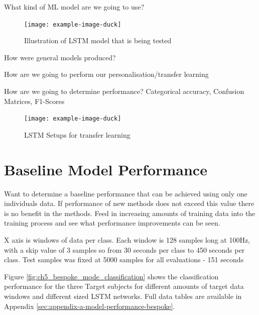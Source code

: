 What kind of ML model are we going to use?
\begin{figure}[htbp]
    \centering
    \texttt{[image: example-image-duck]}
    \caption{Illustration of LSTM model that is being tested}
    \label{fig:ch5_illustration_of_base_LSTM_model}
\end{figure}

How were general models produced?

How are we going to perform our personalisation/transfer learning

How are we going to determine performance? Categorical accuracy, Confusion Matrices, F1-Scores

\begin{figure}[htbp]
    \centering
    \texttt{[image: example-image-duck]}
    \caption{LSTM Setups for transfer learning}
    \label{fig:ch5_LSTM_model_transfer_learning}
\end{figure}


\section{Baseline Model Performance}
\label{sec:personalisation-baseline-model-results}
Want to determine a baseline performance that can be achieved using only one individuals data. If performance of new methods does not exceed this value there is no benefit in the methods. Feed in increasing amounts of training data into the training process and see what performance improvements can be seen.

X axis is windows of data per class. Each window is 128 samples long at 100Hz, with a skip value of 3 samples so from 30 seconds per class to 450 seconds per class. Test samples was fixed at 5000 samples for all evaluations - 151 seconds

Figure \ref{fig:ch5_bespoke_mode_classification} shows the classification performance for the three Target subjects for different amounts of target data windows and different sized LSTM networks. Full data tables are available in Appendix \ref{sec:appendix-a-model-performance-bespoke}.

